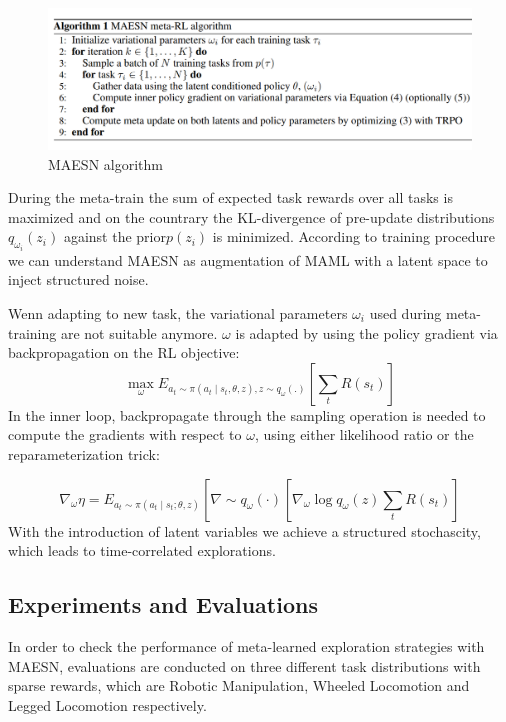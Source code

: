 \begin{figure}[H]
	\includegraphics[scale=0.34]{MAESN_04.PNG}
	\centering
	\caption{MAESN algorithm}
	\label{MAESN}
\end{figure}

During the meta-train the sum of expected task rewards over all tasks is maximized and on the countrary the KL-divergence of pre-update distributions $q_{\omega_{i}}\left(z_{i}\right)$
against the prior$p\left(z_{i}\right)$ is minimized.
According to training procedure we can understand MAESN as augmentation of MAML with a latent space to inject structured noise.

Wenn adapting to new task, the variational parameters $\omega_{i}$ used during meta-training are not suitable anymore. $\omega$ is adapted by using the policy gradient via backpropagation on the RL objective:
$$
\max _{\omega} E_{a_{t} \sim \pi\left(a_{t} \mid s_{t}, \theta, z\right), z \sim q_{\omega}(.)}\left[\sum_{t} R\left(s_{t}\right)\right]
$$
In the inner loop, backpropagate through the sampling operation is needed to compute the gradients with respect to $\omega$, using either likelihood ratio or the reparameterization trick:

$$
\nabla_{\omega} \eta=E_{a_{t} \sim \pi\left(a_{t} \mid s_{t} ; \theta, z\right)}\left[\nabla \sim q_{\omega}(\cdot)^{ }\left[\nabla_{\omega} \log q_{\omega}(z) \sum_{t} R\left(s_{t}\right)\right]\right.
$$
With the introduction of latent variables we achieve a structured stochascity, which leads to time-correlated explorations. 

\subsection{Experiments and Evaluations}
In order to check the performance of meta-learned exploration strategies with MAESN, evaluations are conducted on three different task distributions with sparse rewards, which are Robotic Manipulation, Wheeled Locomotion and Legged Locomotion respectively. 

